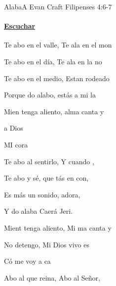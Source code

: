 \documentclass[12pt, spanish]{book}
\newcommand{\NotCCLIed}{\relax}
\begin{document}
    \begin{song}{Alaba}{A}
    {\SBPubDom} %
    {Evan Craft}
    {Filipenses 4:6-7} %
    {} %
        \ifChordBk
        \paragraph{\mbox{}\hfill\protect\href{https://open.spotify.com/intl-es/track/2zLgzu8nD1GLLFwuJxirRl}{Escuchar}\mbox{}\hfill}
        \fi

        \begin{SBOpGroup}
            Te abo en el valle, Te ala en el mon

            Te abo en el día, Te ala en la no

            Te abo en el medio, Estan rodeado

            Porque do alabo,  estás a mi la

            Mien tenga aliento,  alma canta y
        \end{SBOpGroup}

        \begin{SBChorus}
             a Dios

            MI cora
        \end{SBChorus}

        \begin{SBOpGroup}
            Te abo al sentirlo, Y  cuando ,

            Te abo y sé, que tás en con,

            Es más  un sonido,  adora,

            Y do alaba Caerá Jeri.

            Mient tenga aliento, Mi ma canta y
        \end{SBOpGroup}

        \begin{SBOpGroup}
            No  detengo, Mi Dios vivo es

            Có me voy a ca
        \end{SBOpGroup}

        \begin{SBOpGroup}
            Abo al que reina, Abo al Señor,


\end{SBOpGroup}
\end{song}
\end{document}
